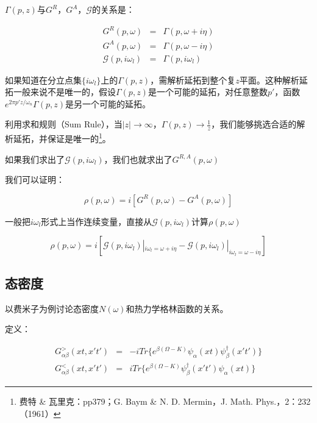 $\Gamma(p,z)$与$G^R$，$G^A$，$\mathcal{G}$的关系是：

\begin{eqnarray}
G^R (p, \omega) &=& \Gamma (p, \omega + i \eta) \\
G^A (p, \omega) &=& \Gamma (p, \omega - i \eta) \\
\mathcal{G} (p, i \omega_l) &=& \Gamma (p, i \omega_l)
\end{eqnarray}

如果知道在分立点集$\{ i \omega_l \}$上的$\Gamma (p, z)$，需解析延拓到整个复$z$平面。这种解析延拓一般来说不是唯一的，假设$\Gamma (p,z)$是一个可能的延拓，对任意整数$p'$，函数$e^{2 \pi p' z / \omega_n} \Gamma(p,z) $是另一个可能的延拓。

利用求和规则（Sum Rule），当$\left| z \right| \to \infty$，$\Gamma (p, z) \to \frac{1}{z}$，我们能够挑选合适的解析延拓，并保证是唯一的\footnote{费特 \& 瓦里克：pp379；G. Baym \& N. D. Mermin，J. Math. Phys.，2：232（1961） }。

如果我们求出了$\mathcal{G}(p, i \omega_l) $，我们也就求出了$G^{R,A} (p, \omega)$

我们可以证明：

\begin{equation}
\rho(p, \omega) = i \left[ G^R (p, \omega) - G^A (p, \omega) \right]
\end{equation}

一般把$i \omega_l$形式上当作连续变量，直接从$\mathcal{G} (p, i \omega_l)$计算$\rho(p, \omega)$


\begin{equation}
\rho(p, \omega) = i \left[ \mathcal{G} (p, i \omega_l )|_{i \omega_l = \omega + i \eta}  - \mathcal{G} (p, i \omega_l )|_{i \omega_l = \omega - i \eta} \right]
\end{equation}

\subsection{态密度}

以费米子为例讨论态密度$N(\omega)$和热力学格林函数的关系。

定义：

\begin{eqnarray}
G_{\alpha \beta}^{>} (xt,x't') &=& -i Tr \{ e^{\beta (\Omega - K) }  \psi_{\alpha} (xt) \psi_{\beta}^{\dagger} (x't')   \} \\
G_{\alpha \beta}^{<} (xt,x't') &=& i Tr \{ e^{\beta ( \Omega - K) }   \psi_{\beta}^{\dagger} (x't') \psi_{\alpha} (xt)  \}
\end{eqnarray}

